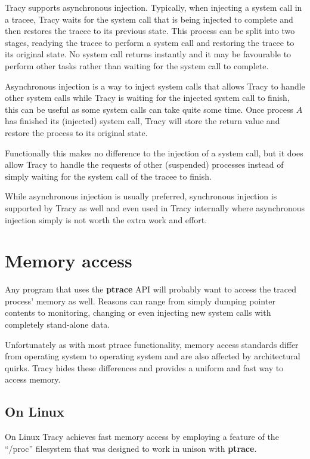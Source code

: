 \documentclass[a4paper, 10pt]{report}
\begin{document}
Tracy supports asynchronous injection. Typically, when injecting a system call
in a tracee, Tracy waits for the system call that is being injected to complete
and then restores the tracee to its previous state. This process can be split
into two stages, readying the tracee to perform a system call and restoring
the tracee to its original state. No system call returns instantly and it
may be favourable to perform other tasks rather than waiting for the system
call to complete.

Asynchronous injection is a way to inject system calls that allows Tracy to
handle other system calls while Tracy is waiting for the injected system call
to finish, this can be useful as some system calls can take quite some time.
Once process $A$ has finished its (injected) system call, Tracy will store
the return value and restore the process to its original state.

Functionally this makes no difference to the injection of a system call, but
it does allow Tracy to handle the requests of other (suspended) processes
instead of simply waiting for the system call of the tracee to finish.

While asynchronous injection is usually preferred, synchronous injection is
supported by Tracy as well and even used in Tracy internally where
asynchronous injection simply is not worth the extra work and effort.

\section{Memory access}


Any program that uses the \textbf{ptrace} API will probably want to access the
traced process' memory as well. Reasons can range from simply dumping pointer
contents to monitoring, changing or even injecting new system calls with
completely stand-alone data.\


Unfortunately as with most ptrace functionality, memory access standards
differ from operating system to operating system and are also
affected by architectural quirks. Tracy hides these differences and
provides a uniform and fast way to access memory.

\subsection{On Linux}
On Linux Tracy achieves fast memory access by employing a feature of the
``/proc'' filesystem that was designed to work in unison with
\textbf{ptrace}.
\end{document}
